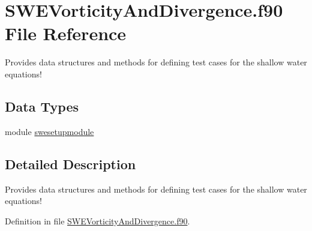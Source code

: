 \hypertarget{_s_w_e_vorticity_and_divergence_8f90}{\section{S\+W\+E\+Vorticity\+And\+Divergence.\+f90 File Reference}
\label{_s_w_e_vorticity_and_divergence_8f90}
}


Provides data structures and methods for defining test cases for the shallow water equations!  


\subsection*{Data Types}
\begin{DoxyCompactItemize}
\item 
module \hyperlink{classswesetupmodule}{swesetupmodule}
\end{DoxyCompactItemize}


\subsection{Detailed Description}
Provides data structures and methods for defining test cases for the shallow water equations! 



Definition in file \hyperlink{_s_w_e_vorticity_and_divergence_8f90_source}{S\+W\+E\+Vorticity\+And\+Divergence.\+f90}.

